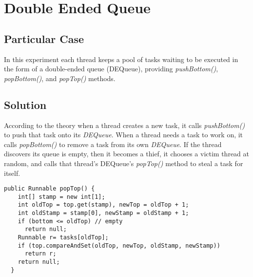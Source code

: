 


\section{\textbf{Double Ended Queue}}



\subsection{Particular Case}
\par
In this experiment each thread keeps a pool of tasks waiting to be executed in the form of a double-ended queue (DEQueue), providing \textit{pushBottom()}, \textit{popBottom()}, and \textit{popTop()} methods.
\par



\subsection{Solution}
\par
According to the theory when a thread creates a new task, it calls\textit{ pushBottom()} to push that task onto its \textit{DEQueue}. When a thread needs a task to work on, it calls \textit{popBottom()} to remove a task from its own \textit{DEQueue}. If the thread discovers its queue is empty, then it becomes a thief, it chooses a victim thread at random, and calls that thread’s DEQueue’s \textit{popTop()} method to steal a task for itself.
\par
\begin{lstlisting}[frame=single,breaklines=true]
  public Runnable popTop() {
    int[] stamp = new int[1];
    int oldTop = top.get(stamp), newTop = oldTop + 1;
    int oldStamp = stamp[0], newStamp = oldStamp + 1;
    if (bottom <= oldTop) // empty
      return null;
    Runnable r= tasks[oldTop];
    if (top.compareAndSet(oldTop, newTop, oldStamp, newStamp))
      return r;
    return null;
  }
\end{lstlisting}


